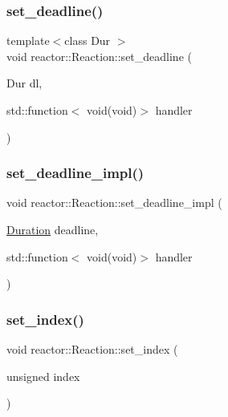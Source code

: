 \subsubsection{\texorpdfstring{set\+\_\+deadline()}{set\_deadline()}}
{\footnotesize\ttfamily template$<$class Dur $>$ \\
void reactor\+::\+Reaction\+::set\+\_\+deadline (\begin{DoxyParamCaption}\item[{Dur}]{dl,  }\item[{std\+::function$<$ void(void)$>$}]{handler }\end{DoxyParamCaption})\hspace{0.3cm}{\ttfamily [inline]}}

\mbox{\label{classreactor_1_1Reaction_a8fee209cdb1d77185b0e9a992c044b71}} 
\subsubsection{\texorpdfstring{set\+\_\+deadline\+\_\+impl()}{set\_deadline\_impl()}}
{\footnotesize\ttfamily void reactor\+::\+Reaction\+::set\+\_\+deadline\+\_\+impl (\begin{DoxyParamCaption}\item[{\hyperlink{namespacereactor_aa8375b807a80703545664096c5b5b779}{Duration}}]{deadline,  }\item[{std\+::function$<$ void(void)$>$}]{handler }\end{DoxyParamCaption})\hspace{0.3cm}{\ttfamily [private]}}

\mbox{\label{classreactor_1_1Reaction_a17c9cece9fe948cc5b85e8b9bd8f77c3}} 
\subsubsection{\texorpdfstring{set\+\_\+index()}{set\_index()}}
{\footnotesize\ttfamily void reactor\+::\+Reaction\+::set\+\_\+index (\begin{DoxyParamCaption}\item[{unsigned}]{index }\end{DoxyParamCaption})}

